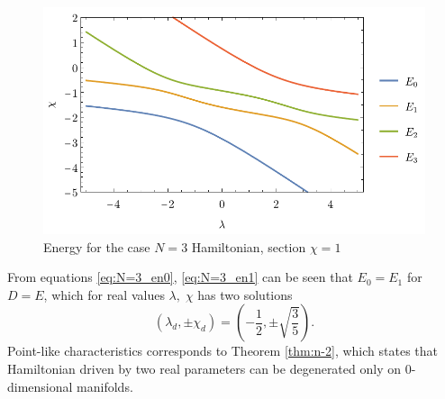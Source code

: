 \begin{figure}[h]
    \centering
    \includegraphics{../img/N=3_energiesc.pdf}
    \caption{Energy for the case $N=3$ Hamiltonian, section $\chi=1$}
    \label{fig:N=3_energiesc}
\end{figure}

From equations \ref{eq:N=3_en0}, \ref{eq:N=3_en1} can be seen that $E_0=E_1$ for $D=E$, which for real values $\lambda,\;\chi$ has two solutions
$$(\lambda_d,\pm \chi_d)=\left(-\frac{1}{2},\pm\sqrt{\frac{3}{5}}\right).$$
Point-like characteristics corresponds to Theorem \ref{thm:n-2}, which states that Hamiltonian driven by two real parameters can be degenerated only on 0-dimensional manifolds. 


